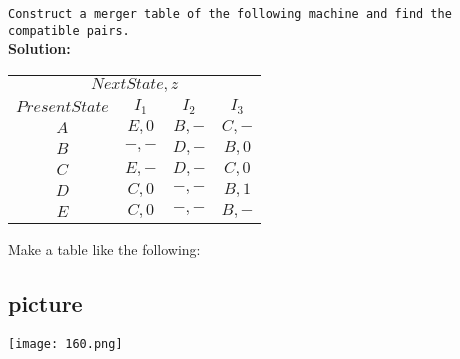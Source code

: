 \documentclass[9pt]{beamer}
\begin{document}
\begin{frame}
 \hspace*{0.1cm} \texttt{Construct a merger table of the following machine and find the compatible pairs.}\\

\textbf{Solution:}\\
\begin{center}
\begin{tabular}{cccc}
 \hline

 \hline

 \hline

 \hline

\multicolumn{4}{c}{$Next State, z$}\\
 \cline{2-4}
       $Present State$   &    $I_1$      &    $I_2$        &        $I_3$      \\
 \hline
     $A$ & $E, 0$ & $B, -$ & $C, -$ \\
     $B$ & $-, -$ & $D, -$ & $B, 0$ \\
     $C$ & $E, -$ & $D, -$ & $C, 0$ \\
     $D$ & $C, 0$ & $-, -$ & $B, 1$ \\
     $E$ & $C, 0$ & $-, -$ & $B, -$ \\
 \hline

 \hline

 \hline

 \hline
\end{tabular}
\end{center}

\vspace*{0.2cm}
\end{frame}

\begin{frame}
Make a table like the following:\\

\begin{center}
\section{picture}
\texttt{[image: 160.png]}
\end{center}
\end{frame}
\end{document}
